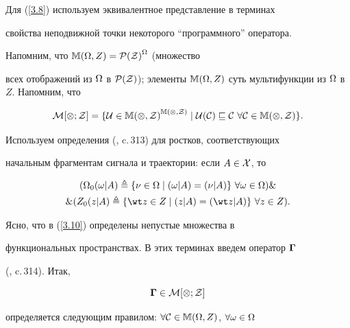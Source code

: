 Для (\ref{3.8}) используем эквивалентное представление в терминах


свойства неподвижной точки некоторого ``программного'' оператора.


Напомним, что $\Bbb{M}(\Omega,Z) = {\cal{P}(Z)}^\Omega$ (множество


всех отображений из $\Om$ в $ \cal{P}(Z)$); элементы $


\Bbb{M}(\Om,Z)$ суть мультифункции из $\Om$ в $Z$. Напомним, что


\begin{equation}\label{3.9}


\cal{M}[\Om;Z] = \{U \in {\Bbb{M}(\Om,Z)}^{\Bbb{M}(\Om,Z)}


\mid U(\cal{C}) \sqsubseteq \cal{C} \ \fo{\cal{C}} \in


\Bbb{M}(\Om,Z)\}.


\end{equation}


Используем определения (\cite{55}, c.\,313) для ростков, соответствующих


начальным фрагментам сигнала и траектории: если $A \in \cal{X}$, то


\begin{multline}\label{3.10}


({{\Om}_0}(\omega \vert A) \triangleq \{\nu \in \Om \mid (\omega \vert


A) = (\nu \vert A)\} \ \fo{\omega} \in \Om) \& \\ 


\& ({Z_0}(z \vert A)


\triangleq \{{\wt z} \in Z \mid (z \vert A) = ({\wt z} \vert


A)\} \ \fo{z} \in Z).


\end{multline}


Ясно, что в (\ref{3.10}) определены непустые множества в


функциональных пространствах. В этих терминах введем оператор $\boldsymbol\Gamma$


(\cite{55}, c.\,314). Итак,


\begin{equation}\label{3.11}


\mG \in \cal{M}[\Om;Z]


\end{equation}


определяется следующим правилом: $\fo{\cal{C}} \in


\Bbb{M}(\Om,Z)$, $\fo{\omega} \in \Om$


